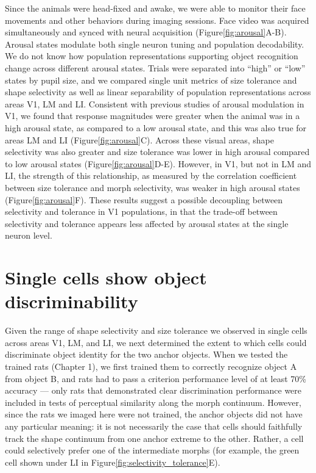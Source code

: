 Since the animals were head-fixed and awake, we were able to monitor their face movements and other behaviors during imaging sessions. Face video was acquired simultaneously and synced with neural acquisition (Figure\ref{fig:arousal}A-B). Arousal states modulate both single neuron tuning and population decodability. We do not know how population representations supporting object recognition change across different arousal states. Trials were separated into ``high'' or ``low'' states by pupil size, and we compared single unit metrics of size tolerance and shape selectivity as well as linear separability of population representations across areas V1, LM and LI. Consistent with previous studies of arousal modulation in V1, we found that response magnitudes were greater when the animal was in a high arousal state, as compared to a low arousal state, and this was also true for areas LM and LI (Figure\ref{fig:arousal}C). Across these visual areas, shape selectivity was also greater and size tolerance was lower in high arousal compared to low arousal states (Figure\ref{fig:arousal}D-E). However, in V1, but not in LM and LI, the strength of this relationship, as measured by the correlation coefficient between size tolerance and morph selectivity, was weaker in high arousal states (Figure\ref{fig:arousal}F). These results suggest a possible decoupling between selectivity and tolerance in V1 populations, in that the trade-off between selectivity and tolerance appears less affected by arousal states at the single neuron level.


\section{Single cells show object discriminability}

Given the range of shape selectivity and size tolerance we observed in single cells across areas V1, LM, and LI, we next determined the extent to which cells could discriminate object identity for the two anchor objects. When we tested the trained rats (Chapter 1), we first trained them to correctly recognize object A from object B, and rats had to pass a criterion performance level of at least 70\% accuracy --- only rats that demonstrated clear discrimination performance were included in tests of perceptual similarity along the morph continuum. However, since the rats we imaged here were not trained, the anchor objects did not have any particular meaning: it is not necessarily the case that cells should faithfully track the shape continuum from one anchor extreme to the other. Rather, a cell could selectively prefer one of the intermediate morphs (for example, the green cell shown under LI in Figure\ref{fig:selectivity_tolerance}E). 

